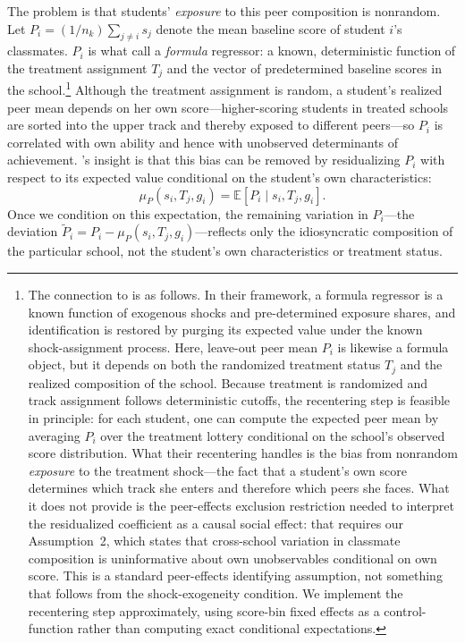 \documentclass[11pt]{article}
\newcommand{\E}{\mathbb{E}}
\begin{document}
The problem is that students' \emph{exposure} to this peer composition is nonrandom. Let $P_i = (1/n_k) \sum_{j \neq i} s_j$ denote the mean baseline score of student $i$'s classmates. $P_i$ is what \citet{borusyak2023nonrandom} call a \emph{formula} regressor: a known, deterministic function of the treatment assignment $T_j$ and the vector of predetermined baseline scores in the school.\footnote{The connection to \citet{borusyak2023nonrandom} is as follows. In their framework, a formula regressor is a known function of exogenous shocks and pre-determined exposure shares, and identification is restored by purging its expected value under the known shock-assignment process. Here, leave-out peer mean $P_i$ is likewise a formula object, but it depends on both the randomized treatment status $T_j$ and the realized composition of the school. Because treatment is randomized and track assignment follows deterministic cutoffs, the \citeauthor{borusyak2023nonrandom} recentering step is feasible in principle: for each student, one can compute the expected peer mean by averaging $P_i$ over the treatment lottery conditional on the school's observed score distribution. What their recentering handles is the bias from nonrandom \emph{exposure} to the treatment shock---the fact that a student's own score determines which track she enters and therefore which peers she faces. What it does not provide is the peer-effects exclusion restriction needed to interpret the residualized coefficient as a causal social effect: that requires our Assumption~2, which states that cross-school variation in classmate composition is uninformative about own unobservables conditional on own score. This is a standard peer-effects identifying assumption, not something that follows from the \citeauthor{borusyak2023nonrandom} shock-exogeneity condition. We implement the recentering step approximately, using score-bin fixed effects as a control-function rather than computing exact conditional expectations.} Although the treatment assignment is random, a student's realized peer mean depends on her own score---higher-scoring students in treated schools are sorted into the upper track and thereby exposed to different peers---so $P_i$ is correlated with own ability and hence with unobserved determinants of achievement. \citeauthor{borusyak2023nonrandom}'s insight is that this bias can be removed by residualizing $P_i$ with respect to its expected value conditional on the student's own characteristics:
\begin{equation}
\mu_P(s_i, T_j, g_i) = \E[P_i \mid s_i, T_j, g_i].
\end{equation}
Once we condition on this expectation, the remaining variation in $P_i$---the deviation $\tilde{P}_i = P_i - \mu_P(s_i, T_j, g_i)$---reflects only the idiosyncratic composition of the particular school, not the student's own characteristics or treatment status.
\end{document}
